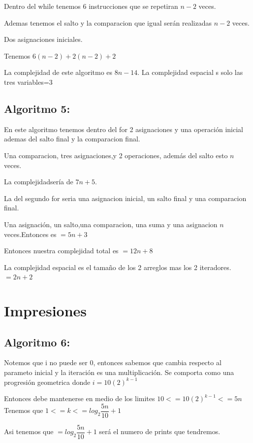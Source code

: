 \documentclass[12pt, fleqn]{article}                             %
\theoremstyle{break}                                            %
\begin{document}
    Dentro del while tenemos 6 instrucciones que se repetiran $n-2$ veces.

    Ademas tenemos el salto y la comparacion que igual serán realizadas $n-2$ veces.

    Dos asignaciones iniciales.

    Tenemos $6(n-2)+2(n-2)+2$

    La complejidad de este algoritmo es $8n-14$.
    La complejidad espacial s solo las tres variables=$3$

    \subsection{Algoritmo 5:}

    

    En este algoritmo tenemos dentro del for 2 asignaciones y una operación inicial ademas del salto final y la comparacion final.

    Una comparacion, tres asignaciones,y 2 operaciones, además del salto esto $n$ veces.

    La complejidadsería de $7n+5$.

    La del segundo for seria una asignacion inicial, un salto final y una comparacion final.

    Una asignación, un salto,una comparacion, una suma y una 
    asignacion $n$ veces.Entonces es $=5n+3$

    Entonces nuestra complejidad total es $=12n+8$

    La complejidad espacial es el tamaño de los 2 arreglos mas los 2 iteradores. $=2n+2$
    \section{Impresiones}
    \subsection{Algoritmo 6:}

    
    Notemos que i no puede ser 0, entonces sabemos que cambia respecto al parameto inicial y la iteración es una multiplicación. Se comporta como una progresión geometrica donde $i=10(2)^{k-1}$

    Entonces debe mantenerse en medio de los limites $10<=10(2)^{k-1}<=5n$ Tenemos que $1<=k<=log_{2}\dfrac{5n}{10}+1$

    Asi tenemos que $= log_{2}\dfrac{5n}{10} +1$ será el numero de prints que tendremos.
\end{document}
